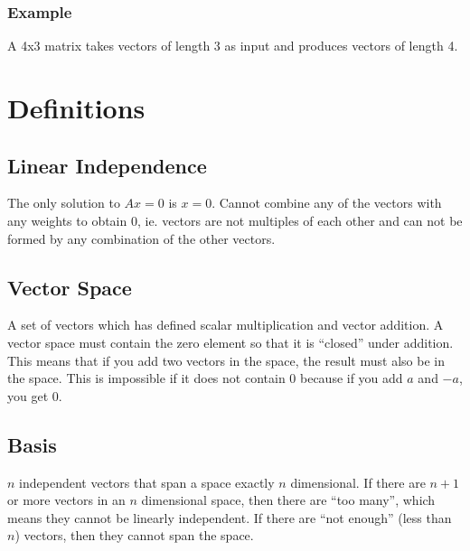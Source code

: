 \documentclass[12pt]{article}
\begin{document}
\subsubsection{Example}
A 4x3 matrix takes vectors of length 3 as input and produces vectors of length 4.


\section{Definitions}
\subsection{Linear Independence}
The only solution to $Ax = 0$ is $x = 0$. Cannot combine any of the vectors with any weights to obtain 0, ie. vectors are not multiples of each other and can not be formed by any combination of the other vectors.

\subsection{Vector Space}
A set of vectors which has defined scalar multiplication and vector addition. A vector space must contain the zero element so that it is ``closed'' under addition. This means that if you add two vectors in the space, the result must also be in the space.  This is impossible if it does not contain $0$ because if you add $a$ and $-a$, you get $0$.

\subsection{Basis}
$n$ independent vectors that span a space exactly $n$ dimensional.  If there are $n+1$ or more vectors in an $n$ dimensional space, then there are ``too many'', which means they cannot be linearly independent. If there are ``not enough'' (less than $n$) vectors, then they cannot span the space.
\end{document}
